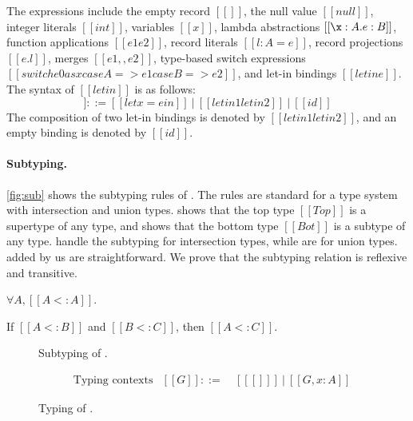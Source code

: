The expressions include the empty record $[[{}]]$, the null value $[[null]]$,
integer literals $[[int]]$, variables $[[x]]$, lambda abstractions $[[\x:A. e:B]]$,
function applications $[[e1 e2]]$, record literals $[[{l : A = e}]]$, record
projections $[[e.l]]$, merges $[[e1 ,, e2]]$, type-based switch expressions
$[[switch e0 as x case A => e1 case B => e2]]$, and let-in bindings $[[letin e]]$.
The syntax of $[[letin]]$ is as follows:
\begin{equation*}
  [[letin]] ::= [[let x = e in]] ~|~ [[letin1 letin2]] ~|~ [[id]]
\end{equation*}
The composition of two let-in bindings is denoted by $[[letin1 letin2]]$, and an
empty binding is denoted by $[[id]]$.

\paragraph{Subtyping.}
\autoref{fig:sub} shows the subtyping rules of \lambdaiu. The rules are standard
for a type system with intersection and union types.  shows that
the top type $[[Top]]$ is a supertype of any type, and  shows that
the bottom type $[[Bot]]$ is a subtype of any type.
 handle the subtyping for intersection types,
while  are for union types. 
added by us are straightforward. We prove that the subtyping relation is
reflexive and transitive.

\begin{theorem}
  $\forall A, [[A <: A]]$.
\end{theorem}
\begin{theorem}
  If $[[A <: B]]$ and $[[B <: C]]$, then $[[A <: C]]$.
\end{theorem}

\begin{figure}
\IUdefnsub{}
\caption{Subtyping of \lambdaiu.} \label{fig:sub}
\end{figure}

\begin{figure}
\begin{align*}
  &\text{Typing contexts}&[[G]] ::=&~ [[ [] ]] ~|~ [[G, x : A]]
\end{align*}
\IUdefntyping{}
\IUdefnletbind{}
\caption{Typing of \lambdaiu.} \label{fig:typ}
\end{figure}

